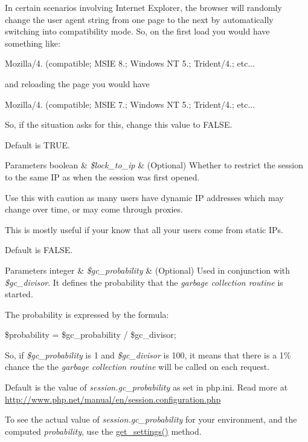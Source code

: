 In certain scenarios involving Internet Explorer, the browser will randomly change the user agent string from one page to the next by automatically switching into compatibility mode. So, on the first load you would have something like\+:

{\ttfamily Mozilla/4. (compatible; M\+S\+IE 8.; Windows NT 5.; Trident/4.; etc...}

and reloading the page you would have

{\ttfamily  Mozilla/4. (compatible; M\+S\+IE 7.; Windows NT 5.; Trident/4.; etc...}

So, if the situation asks for this, change this value to F\+A\+L\+SE.

Default is T\+R\+UE.


\begin{DoxyParams}[1]{Parameters}
boolean & {\em \$lock\+\_\+to\+\_\+ip} & (Optional) Whether to restrict the session to the same IP as when the session was first opened.\\
\hline
\end{DoxyParams}
Use this with caution as many users have dynamic IP addresses which may change over time, or may come through proxies.

This is mostly useful if your know that all your users come from static I\+Ps.

Default is F\+A\+L\+SE.


\begin{DoxyParams}[1]{Parameters}
integer & {\em \$gc\+\_\+probability} & (Optional) Used in conjunction with {\itshape \$gc\+\_\+divisor}. It defines the probability that the {\itshape garbage collection routine} is started.\\
\hline
\end{DoxyParams}
The probability is expressed by the formula\+:

{\ttfamily  \$probability = \$gc\+\_\+probability / \$gc\+\_\+divisor; }

So, if {\itshape \$gc\+\_\+probability} is 1 and {\itshape \$gc\+\_\+divisor} is 100, it means that there is a 1\% chance the the {\itshape garbage collection routine} will be called on each request.

Default is the value of {\itshape session.\+gc\+\_\+probability} as set in php.\+ini. Read more at \mbox{\hyperlink{}{http\+://www.\+php.\+net/manual/en/session.\+configuration.\+php}}

To see the actual value of {\itshape session.\+gc\+\_\+probability} for your environment, and the computed {\itshape probability}, use the \mbox{\hyperlink{class_zebra___session_abcfd9631c087a2aa25d472ad9b450c4f}{get\+\_\+settings()}} method.

